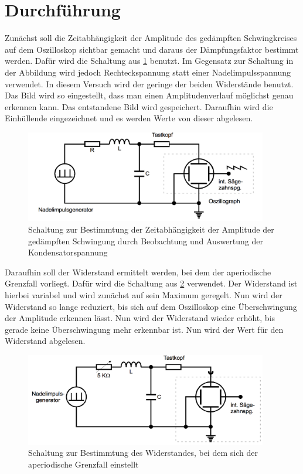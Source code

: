 \section{Durchführung}
\label{sec:Durchführung}
Zunächst soll die Zeitabhängigkeit der Amplitude des gedämpften Schwingkreises auf
dem Oszilloskop sichtbar gemacht und daraus der Dämpfungsfaktor bestimmt werden.
Dafür wird die Schaltung aus \ref{fig:aufbau_1} benutzt. Im Gegensatz zur Schaltung in der Abbildung
wird jedoch Rechteckspannung statt einer Nadelimpulsspannung verwendet. In diesem
Versuch wird der geringe der beiden Widerstände benutzt.  Das Bild wird so eingestellt,
dass man einen Amplitudenverlauf möglichst genau erkennen kann. Das entstandene Bild
wird gespeichert. Daraufhin wird die Einhüllende eingezeichnet und es werden Werte
von dieser abgelesen.
\begin{figure}
  \centering
  \includegraphics[width=300pt]{data/aufbau_1.png}
  \caption{Schaltung zur Bestimmtung der Zeitabhängigkeit der Amplitude der gedämpften
  Schwingung durch Beobachtung und Auswertung der Kondensatorspannung \cite{Versuchsanleitung1}}
  \label{fig:aufbau_1}
\end{figure}


Daraufhin soll der Widerstand ermittelt werden, bei dem der aperiodische Grenzfall
vorliegt. Dafür wird die Schaltung aus \ref{fig:aufbau_2} verwendet. Der Widerstand ist hierbei variabel
und wird zunächst auf sein Maximum geregelt. Nun wird der Widerstand so lange reduziert,
bis sich auf dem Oszilloskop eine Überschwingung der Amplitude erkennen lässt. Nun wird
der Widerstand wieder erhöht, bis gerade keine Überschwingung mehr erkennbar ist. Nun
wird der Wert für den Widerstand abgelesen.
\begin{figure}
  \centering
  \includegraphics[width=300pt]{data/aufbau_2.png}
  \caption{Schaltung zur Bestimmtung des Widerstandes, bei dem sich der aperiodische
  Grenzfall einstellt \cite{Versuchsanleitung1}}
  \label{fig:aufbau_2}
\end{figure}


